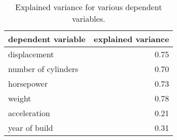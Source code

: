 \begin{table}
  \centering
  \begin{tabular}{|l|r|}
  \hline
  dependent variable  & explained variance   \\
  \hline
  \hline
  displacement        & 0.75                 \\
  \hline
  number of cylinders & 0.70                 \\
  \hline
  horsepower          & 0.73                 \\
  \hline
  weight              & 0.78                 \\
  \hline
  acceleration        & 0.21                 \\
  \hline
  year of build       & 0.31                 \\
  \hline
  \end{tabular}
  \caption[explained variance]{Explained variance for various dependent variables.}
  \label{tab:explained-variance}
\end{table}


